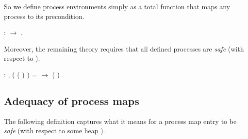 \documentclass[12pt]{report}
\begin{document}
 So we define process environments simply as a total function
     that maps any process to its precondition. \begin{coqdoccode}
\coqdocemptyline
\coqdocnoindent
{}  :  \ensuremath{\rightarrow} .\coqdoceol
\coqdocemptyline
\end{coqdoccode}
Moreover, the remaining theory requires that all defined processes
    are \textit{safe} (with respect to ).  \begin{coqdoccode}
\coqdocemptyline
\coqdocnoindent
{}  :\coqdoceol
\coqdocindent{1.00em}
\coqdockw{\ensuremath{\forall}}   ,\coqdoceol
\coqdocindent{2.00em}
 ( ( ) )  =  \ensuremath{\rightarrow}\coqdoceol
\coqdocindent{2.00em}
 (  ) .\coqdoceol
\coqdocemptyline
\end{coqdoccode}
\subsection{Adequacy of process maps}



 The following definition captures what it means
    for a process map entry  to be \textit{safe}
    (with respect to some heap ). 
\end{document}
